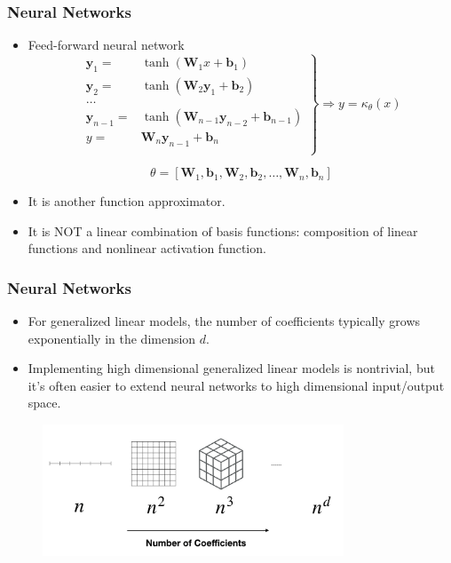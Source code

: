 \documentclass{beamer}
\newcommand{\by}{\mathbf{y}}
\begin{document}
\begin{frame}
\frametitle{Neural Networks}

\begin{itemize}
	\item Feed-forward neural network
	\begin{equation*}
\left.\begin{aligned}
\by_1 =& \tanh(\mathbf{W}_1 x + \mathbf{b}_1)\\
\by_2 =& \tanh(\mathbf{W}_2 \by_1 + \mathbf{b}_2)\\
\ldots\\
\by_{n-1} =& \tanh(\mathbf{W}_{n-1} \by_{n-2} + \mathbf{b}_{n-1})\\
y =& \mathbf{W}_n \by_{n-1} + \mathbf{b}_n\\
\end{aligned}  \right\} \Rightarrow y = \kappa_{\theta}(x)
\end{equation*}

$$\theta = [\mathbf{W}_1, \mathbf{b}_1, \mathbf{W}_2, \mathbf{b}_2, \ldots, \mathbf{W}_n, \mathbf{b}_n]$$

\item It is another function approximator.
\item It is NOT a linear combination of basis functions: composition of linear functions and nonlinear activation function. 
\end{itemize}

\end{frame}

\begin{frame}
	\frametitle{Neural Networks}

\begin{itemize}
	\item For generalized linear models, the number of coefficients typically grows exponentially in the dimension $d$.
	\item Implementing high dimensional  generalized linear models is nontrivial, but it's often easier to extend neural networks to high dimensional input/output space. 
\end{itemize}
\begin{figure}[hbt]
  \includegraphics[width=0.8\textwidth]{figures/coef}
\end{figure}


\end{frame}
\end{document}
